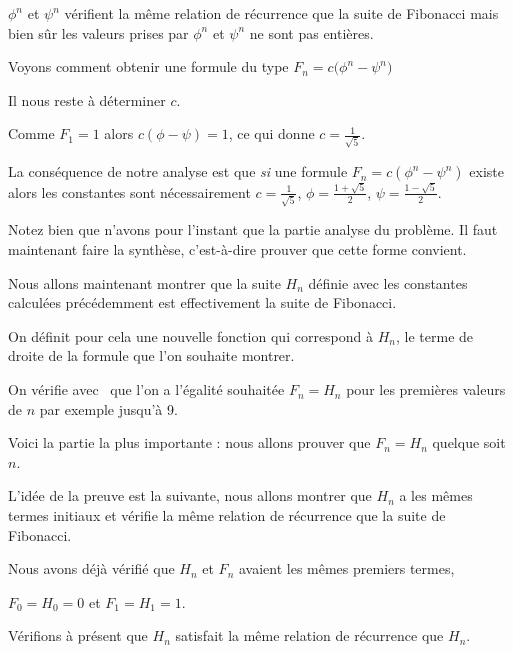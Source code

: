   $\phi^n$ et $\psi^n$ vérifient la même relation de récurrence 
  que la suite de Fibonacci 
  mais bien sûr les valeurs prises 
  par $\phi^n$ et $\psi^n$ 
  ne sont pas entières.
  
\change
Voyons comment obtenir une formule du type 
$F_n = c  \big(\phi^n-\psi^n\big)$
  

\change
Il nous reste à déterminer $c$. 

Comme $F_1=1$ alors 
$c(\phi-\psi)=1$, ce qui donne $c = \frac{1}{\sqrt 5}$.


\change
La conséquence de notre analyse est que \emph{si} une formule 
  $F_n = c(\phi^n-\psi^n)$ existe alors les constantes sont
  nécessairement $c= \frac{1}{\sqrt 5}$, $\phi = \frac{1+\sqrt5}{2}$, 
  $\psi  = \frac{1-\sqrt5}{2}$.
  
Notez bien que n'avons pour l'instant que la partie analyse du problème.
Il faut maintenant faire la synthèse, c'est-à-dire  
prouver que cette forme convient.



\diapo
  Nous allons maintenant montrer que la suite $H_n$ définie avec 
  les constantes calculées précédemment est effectivement la suite de Fibonacci.
  
\change
On définit pour cela une nouvelle fonction  
qui correspond à $H_n$, le terme de droite de la formule que l'on souhaite montrer.

\change
On vérifie avec \Sage\ que l'on a l'égalité souhaitée $F_n=H_n$ 
pour les premières valeurs de $n$ par exemple jusqu'à 9.
    
 

\diapo   
 
 
Voici la partie la plus importante : nous allons prouver que
$F_n=H_n$ quelque soit $n$.

L'idée de la preuve est la suivante, nous allons montrer que $H_n$ 
a les mêmes termes initiaux et vérifie la même relation de récurrence
que la suite de Fibonacci.

\change

Nous avons déjà vérifié que $H_n$ et $F_n$ avaient les mêmes premiers termes,

$F_0=H_0=0$ et $F_1=H_1=1$.

\change 
Vérifions à présent que $H_n$ satisfait la même relation de récurrence que $H_n$.


